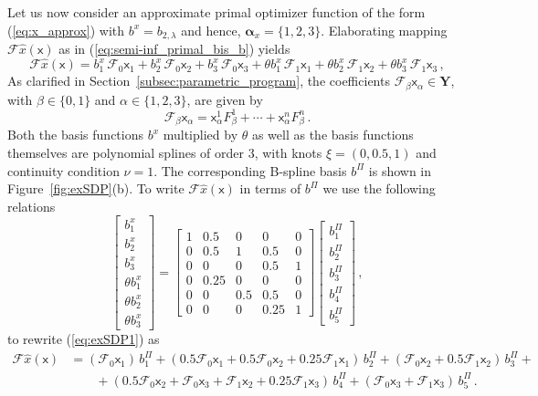 \documentclass{article}
\newcommand{\ppar}{\theta}                          %
\newcommand{\Y}{\mathbf{Y}}                         %
\newcommand{\calF}{\mathcal{F}}                     %
\newcommand{\bx}{b^x}               %
\newcommand{\cx}{\textsf{x}}        %
\newcommand{\cxa}{\cx_\alpha}       %
\newcommand{\Alpha}{\bm{\alpha}}    %
\newcommand{\bPi}{b^\Pi}                %
\begin{document}
Let us now consider an approximate primal optimizer function of the form (\ref{eq:x_approx}) with $\bx = b_{2,\lambda}$ and hence, $\Alpha_x=\{1,2,3\}$. Elaborating mapping $\calF \hat{x}(\cx)$ as in (\ref{eq:semi-inf_primal_bis_b}) yields
\begin{equation}\label{eq:exSDP1}
\calF \hat{x}(\cx) = \bx_1 \, \calF_0\cx_1 + \bx_2 \, \calF_0\cx_2 + \bx_3 \, \calF_0\cx_3 + \ppar\bx_1 \, \calF_1\cx_1 + \ppar\bx_2 \, \calF_1\cx_2 + \ppar\bx_3 \, \calF_1\cx_3 \,,%
\end{equation}
As clarified in Section~\ref{subsec:parametric_program}, the coefficients $\calF_\beta \cxa \in \Y$, with $\beta\in\{0,1\}$ and $\alpha\in\{1,2,3\}$, are given by
\[ \calF_\beta \cxa = \cxa^1 F_\beta^1 + \cdots + \cxa^n F_\beta^n \,.
\]
Both the basis functions $\bx$ multiplied by $\ppar$ as well as the basis functions themselves are polynomial splines of order 3, with knots $\xi = (0, 0.5, 1)$ and continuity condition $\nu = 1$. The corresponding B-spline basis $\bPi$ is shown in Figure~\ref{fig:exSDP}(b). To write $\calF \hat{x}(\cx)$ in terms of $\bPi$ we use the following relations
\[ \begin{bmatrix} \bx_1 \\ \bx_2 \\ \bx_3 \\ \ppar\bx_1 \\ \ppar\bx_2 \\ \ppar\bx_3 \end{bmatrix} = %
   \begin{bmatrix} 1 & 0.5  & 0   & 0    & 0 \\
                   0 & 0.5  & 1   & 0.5  & 0 \\
                   0 & 0    & 0   & 0.5  & 1 \\
                   0 & 0.25 & 0   & 0    & 0 \\
                   0 & 0    & 0.5 & 0.5  & 0 \\
                   0 & 0    & 0   & 0.25 & 1 \end{bmatrix}
   \begin{bmatrix} \bPi_1 \\ \bPi_2 \\ \bPi_3 \\  \bPi_4 \\ \bPi_5 \end{bmatrix} \,,%
\]
to rewrite (\ref{eq:exSDP1}) as
\[\begin{aligned}
    \calF \hat{x}(\cx) &= (\calF_0\cx_1)\,\bPi_1 + (0.5\calF_0\cx_1 + 0.5\calF_0\cx_2 + 0.25 \calF_1\cx_1)\, \bPi_2 %
                       + (\calF_0\cx_2+0.5\calF_1\cx_2)\,\bPi_3 + \\%
                       &\qquad + (0.5\calF_0\cx_2+\calF_0\cx_3+\calF_1\cx_2+0.25\calF_1\cx_3)\,\bPi_4 %
                       + (\calF_0\cx_3 +\calF_1\cx_3)\,\bPi_5\,.
\end{aligned}\]
\end{document}
